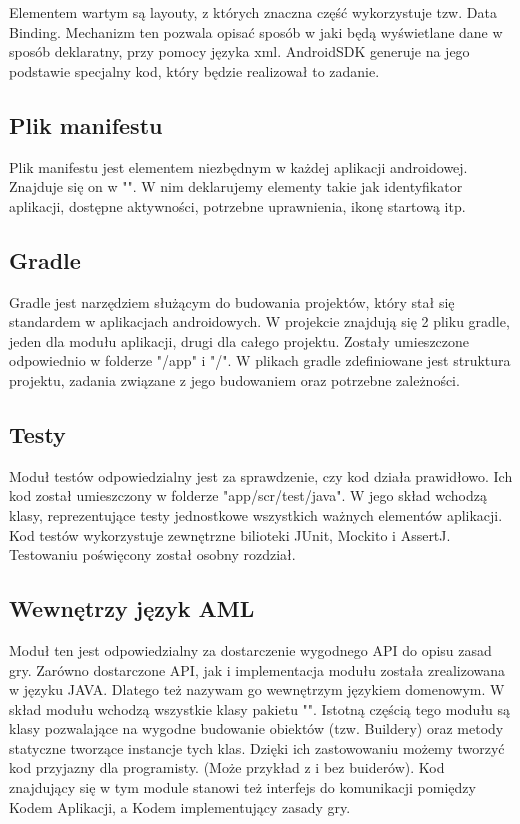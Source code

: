 \documentclass	{xmgr}
\begin{document}
Elementem wartym są layouty, z których znaczna część wykorzystuje tzw. Data Binding. Mechanizm ten pozwala opisać sposób w jaki będą wyświetlane dane w sposób deklaratny, przy pomocy języka xml. AndroidSDK generuje na jego podstawie specjalny kod, który będzie realizował to zadanie. 


\subsection{Plik manifestu}
Plik manifestu jest elementem niezbędnym w każdej aplikacji androidowej. Znajduje się on w "". W nim deklarujemy elementy takie jak identyfikator aplikacji, dostępne aktywności, potrzebne uprawnienia, ikonę startową itp.

\subsection{Gradle}
Gradle jest narzędziem służącym do budowania projektów, który stał się standardem w aplikacjach androidowych. W projekcie znajdują się 2 pliku gradle, jeden dla modułu aplikacji, drugi dla całego projektu. Zostały umieszczone odpowiednio w folderze "/app" i "/". W plikach gradle zdefiniowane jest struktura projektu, zadania związane z jego budowaniem oraz potrzebne zależności.

\subsection{Testy}
Moduł testów odpowiedzialny jest za sprawdzenie, czy kod działa prawidłowo. Ich kod został umieszczony w folderze "app/scr/test/java". W jego skład wchodzą klasy, reprezentujące testy jednostkowe wszystkich ważnych elementów aplikacji. Kod testów wykorzystuje zewnętrzne bilioteki JUnit, Mockito i AssertJ. Testowaniu poświęcony został osobny rozdział.

\subsection{Wewnętrzy język AML}
Moduł ten jest odpowiedzialny za dostarczenie wygodnego API do opisu zasad gry. Zarówno dostarczone API, jak i implementacja modułu została zrealizowana w języku JAVA. Dlatego też nazywam go wewnętrzym językiem domenowym.
W skład modułu wchodzą wszystkie klasy pakietu "".
Istotną częścią tego modułu są klasy pozwalające na wygodne budowanie obiektów (tzw. Buildery) oraz metody statyczne tworzące instancje tych klas. Dzięki ich zastowowaniu możemy tworzyć kod przyjazny dla programisty. (Może przykład z i bez buiderów).
Kod znajdujący się w tym module stanowi też interfejs do komunikacji pomiędzy Kodem Aplikacji, a Kodem implementujący zasady gry.
\end{document}
